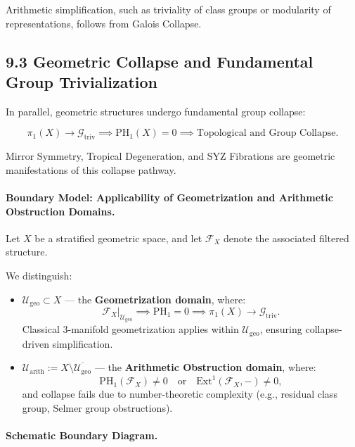 \documentclass[11pt]{article}
\begin{document}
Arithmetic simplification, such as triviality of class groups or modularity of representations, follows from Galois Collapse.

\subsection*{9.3 Geometric Collapse and Fundamental Group Trivialization}

In parallel, geometric structures undergo fundamental group collapse:

\[
\pi_1(X) \longrightarrow \mathcal{G}_{\mathrm{triv}} \implies \mathrm{PH}_1(X) = 0 \implies \text{Topological and Group Collapse}.
\]

Mirror Symmetry, Tropical Degeneration, and SYZ Fibrations are geometric manifestations of this collapse pathway.

\paragraph{Boundary Model: Applicability of Geometrization and Arithmetic Obstruction Domains.}

Let \( X \) be a stratified geometric space, and let \( \mathcal{F}_X \) denote the associated filtered structure.

We distinguish:

\begin{itemize}
    \item \( \mathcal{U}_{\mathrm{geo}} \subset X \) — the \textbf{Geometrization domain}, where:
    \[
    \mathcal{F}_X|_{\mathcal{U}_{\mathrm{geo}}} \implies \mathrm{PH}_1 = 0 \implies \pi_1(X) \longrightarrow \mathcal{G}_{\mathrm{triv}}.
    \]
    Classical 3-manifold geometrization applies within \( \mathcal{U}_{\mathrm{geo}} \), ensuring collapse-driven simplification.

    \item \( \mathcal{U}_{\mathrm{arith}} := X \setminus \overline{\mathcal{U}_{\mathrm{geo}}} \) — the \textbf{Arithmetic Obstruction domain}, where:
    \[
    \mathrm{PH}_1(\mathcal{F}_X) \neq 0 \quad \text{or} \quad \mathrm{Ext}^1(\mathcal{F}_X, -) \neq 0,
    \]
    and collapse fails due to number-theoretic complexity (e.g., residual class group, Selmer group obstructions).
\end{itemize}

\paragraph{Schematic Boundary Diagram.}
\end{document}
